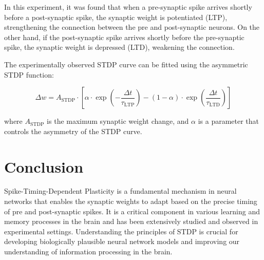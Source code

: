 \documentclass{article}
\begin{document}
In this experiment, it was found that when a pre-synaptic spike arrives shortly before a post-synaptic spike, the synaptic weight is potentiated (LTP), strengthening the connection between the pre and post-synaptic neurons. On the other hand, if the post-synaptic spike arrives shortly before the pre-synaptic spike, the synaptic weight is depressed (LTD), weakening the connection.

The experimentally observed STDP curve can be fitted using the asymmetric STDP function:

\begin{equation}
\Delta w = A_{\text{STDP}} \cdot \left[\alpha \cdot \exp\left(-\frac{\Delta t}{\tau_{\text{LTP}}}\right) - (1 - \alpha) \cdot \exp\left(\frac{\Delta t}{\tau_{\text{LTD}}}\right)\right]
\end{equation}

where \(A_{\text{STDP}}\) is the maximum synaptic weight change, and \(\alpha\) is a parameter that controls the asymmetry of the STDP curve.

\section{Conclusion}
Spike-Timing-Dependent Plasticity is a fundamental mechanism in neural networks that enables the synaptic weights to adapt based on the precise timing of pre and post-synaptic spikes. It is a critical component in various learning and memory processes in the brain and has been extensively studied and observed in experimental settings. Understanding the principles of STDP is crucial for developing biologically plausible neural network models and improving our understanding of information processing in the brain.
\end{document}
